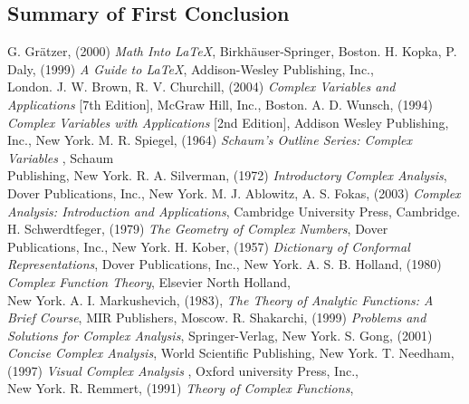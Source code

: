 \documentclass[11pt]{gthesis2}  %
\begin{document}
\subsection{Summary of First Conclusion}
\label{sub:sumconcl1}
%
%
%
\newpage
%
%
%
%
\begin{thebibliography}{99}%
%
%
 G. Gr\"{a}tzer, (2000)
 \emph{Math Into \LaTeX}, Birkh\"{a}user-Springer, Boston.
%
 H. Kopka, P. Daly, (1999)
 \emph{A Guide to \LaTeX}, Addison-Wesley Publishing, Inc., \\London.
%
%
 J. W. Brown, R. V. Churchill, (2004)
 \emph{Complex Variables and Applications} [7th Edition],
 McGraw Hill, Inc., Boston.
%
 A. D. Wunsch, (1994)
 \emph{Complex Variables with Applications} [2nd Edition],
 Addison Wesley Publishing, Inc., New York.
%
 M. R. Spiegel, (1964)
 \emph{Schaum's Outline Series: Complex Variables} ,
 Schaum \\ Publishing, New York.
%
 R. A. Silverman, (1972)
 \emph{Introductory Complex Analysis},
 Dover Publications, Inc., New York.
%
 M. J. Ablowitz, A. S. Fokas, (2003)
 \emph{Complex Analysis: Introduction and Applications},
 Cambridge University Press, Cambridge.
%
 H. Schwerdtfeger, (1979)
 \emph{The Geometry of Complex Numbers},
 Dover Publications, Inc., New York.
%
 H. Kober, (1957)
 \emph{Dictionary of Conformal Representations},
 Dover Publications, Inc., New York.
%
 A. S. B. Holland, (1980)
 \emph{Complex Function Theory},
 Elsevier North Holland,\\ New York.
%
 A. I. Markushevich, (1983), \emph{The Theory of Analytic
 Functions: A Brief Course},
 MIR Publishers, Moscow.
%
 R. Shakarchi, (1999)
 \emph{Problems and Solutions for Complex Analysis},
 Springer-Verlag, New York.
%
 S. Gong, (2001)
 \emph{Concise Complex Analysis},
 World Scientific Publishing, New York.
%
 T. Needham, (1997)
 \emph{Visual Complex Analysis} ,
 Oxford university Press, Inc., \\ New York.
%
 R. Remmert, (1991) \emph{Theory of Complex Functions},

\end{thebibliography}
\end{document}
